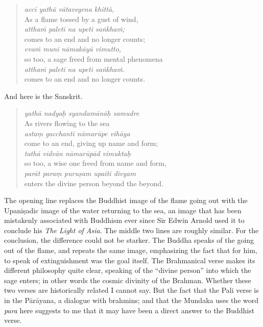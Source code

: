 \documentclass[12pt,openany]{book}%
\begin{document}
\begin{verse}%
\textit{\textsanskrit{accī} \textsanskrit{yathā} \textsanskrit{vātavegena} \textsanskrit{khittā},} \\
As a flame tossed by a gust of wind, \\
\textit{\textsanskrit{atthaṁ} paleti na upeti \textsanskrit{saṅkhaṁ};} \\
comes to an end and no longer counts; \\
\textit{\textsanskrit{evaṁ} \textsanskrit{munī} \textsanskrit{nāmakāyā} vimutto,} \\
so too, a sage freed from mental phenomena \\
\textit{\textsanskrit{atthaṁ} paleti na upeti \textsanskrit{saṅkhaṁ}.} \\
comes to an end and no longer counts.

%
\end{verse}

And here is the Sanskrit.

\begin{verse}%
\textit{\textsanskrit{yathā} nadyaḥ \textsanskrit{syandamānāḥ} samudre} \\
As rivers flowing to the sea \\
\textit{astaṃ gacchanti \textsanskrit{nāmarūpe} \textsanskrit{vihāya}} \\
come to an end, giving up name and form; \\
\textit{\textsanskrit{tathā} \textsanskrit{vidvān} \textsanskrit{nāmarūpād} vimuktaḥ} \\
so too, a wise one freed from name and form, \\
\textit{\textsanskrit{parāt} paraṃ \textsanskrit{puruṣam} upaiti divyam} \\
enters the divine person beyond the beyond.

%
\end{verse}

The opening line replaces the Buddhist image of the flame going out with the \textsanskrit{Upaniṣadic} image of the water returning to the sea, an image that has been mistakenly associated with Buddhism ever since Sir Edwin Arnold used it to conclude his \textit{The Light of Asia}. The middle two lines are roughly similar. For the conclusion, the difference could not be starker. The Buddha speaks of the going out of the flame, and repeats the same image, emphasizing the fact that for him, to speak of extinguishment was the goal itself. The Brahmanical verse makes its different philosophy quite clear, speaking of the “divine person” into which the sage enters; in other words the cosmic divinity of the Brahman. Whether these two verses are historically related I cannot say. But the fact that the Pali verse is in the \textsanskrit{Pārāyana}, a dialogue with brahmins; and that the Mundaka uses the word \textit{para} here suggests to me that it may have been a direct answer to the Buddhist verse.
\end{document}
